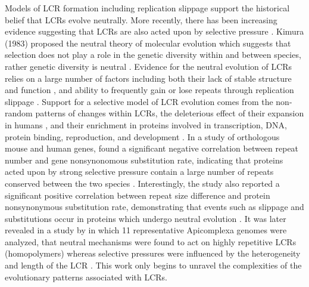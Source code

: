 \documentclass{article}
\begin{document}
Models of LCR formation including replication slippage support the historical belief that LCRs evolve neutrally. More
recently, there has been increasing evidence suggesting that LCRs are also acted upon by selective pressure \citep{haerty2010low}. Kimura (1983) proposed the neutral theory of molecular evolution which suggests that selection does not play a role
in the genetic diversity within and between species, rather genetic diversity is neutral \citep{nevo2001genetic}. Evidence for the neutral evolution of LCRs relies on a large number of factors including both their lack of stable structure and function \citep{dunker2002intrinsic, haerty2010low}, and ability to frequently gain or lose repeats through replication slippage \citep{marcotte1999census, kruglyak1998equilibrium, huntley2000evolution}. Support for a selective model of LCR evolution comes from the non-random patterns of changes within LCRs, the deleterious effect of their expansion in humans \citep{karlin2002amino}, and their
enrichment in proteins involved in transcription, DNA, protein binding, reproduction, and development \citep{huntley2007evolutionary, haerty2010genome, battistuzzi2016profiles}. In a study of orthologous mouse and human genes, \citet{mularoni2007highly} found a significant negative correlation between repeat number and gene nonsynonomous substitution rate, indicating
that proteins acted upon by strong selective pressure contain a large number of repeats conserved between the two species
\citep{mularoni2007highly}. Interestingly, the study also reported a significant positive correlation between repeat size difference
and protein nonsynonymous substitution rate, demonstrating that events such as slippage and substitutions occur in proteins
which undergo neutral evolution \citep{mularoni2007highly}. It was later revealed in a study by \citet{battistuzzi2016profiles} in which 11 representative Apicomplexa genomes were analyzed, that neutral mechanisms were found to act on highly repetitive LCRs
(homopolymers) whereas selective pressures were influenced by the heterogeneity and length of the LCR \citep{battistuzzi2016profiles}. This work only begins to unravel the complexities of the evolutionary patterns associated with LCRs.
\end{document}
